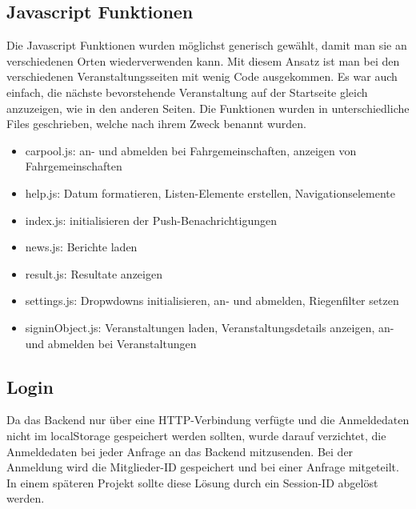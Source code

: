 \newpage
\FloatBarrier
\subsection{Javascript Funktionen}
Die Javascript Funktionen wurden möglichst generisch gewählt, damit man sie an verschiedenen Orten wiederverwenden kann. Mit diesem Ansatz ist man bei den verschiedenen Veranstaltungsseiten mit wenig Code ausgekommen. Es war auch einfach, die nächste bevorstehende Veranstaltung auf der Startseite gleich anzuzeigen, wie in den anderen Seiten. Die Funktionen wurden in unterschiedliche Files geschrieben, welche nach ihrem Zweck benannt wurden.
\begin{itemize}
\item carpool.js: an- und abmelden bei Fahrgemeinschaften, anzeigen von Fahrgemeinschaften
\item help.js:  Datum formatieren,  Listen-Elemente erstellen, Navigationselemente
\item index.js: initialisieren der Push-Benachrichtigungen
\item news.js: Berichte laden
\item result.js: Resultate anzeigen
\item settings.js: Dropwdowns initialisieren, an- und abmelden, Riegenfilter setzen
\item signinObject.js: Veranstaltungen laden, Veranstaltungsdetails anzeigen, an- und abmelden bei Veranstaltungen 
\end{itemize}

\subsection{Login}
Da das Backend nur über eine HTTP-Verbindung verfügte und die Anmeldedaten nicht im localStorage  gespeichert werden sollten, wurde darauf verzichtet, die Anmeldedaten bei jeder Anfrage an das Backend mitzusenden. Bei der Anmeldung wird die Mitglieder-ID gespeichert und bei einer Anfrage mitgeteilt. In einem späteren Projekt sollte diese Lösung durch ein Session-ID abgelöst werden.

